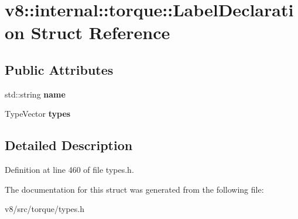 \hypertarget{structv8_1_1internal_1_1torque_1_1LabelDeclaration}{}\section{v8\+:\+:internal\+:\+:torque\+:\+:Label\+Declaration Struct Reference}
\label{structv8_1_1internal_1_1torque_1_1LabelDeclaration}
\subsection*{Public Attributes}
\begin{DoxyCompactItemize}
\item 
\mbox{\label{structv8_1_1internal_1_1torque_1_1LabelDeclaration_a56814c35c6bdcf618b18dcbbd687a411}} 
std\+::string {\bfseries name}
\item 
\mbox{\label{structv8_1_1internal_1_1torque_1_1LabelDeclaration_a82ccafb536f8469d411b058c65793566}} 
Type\+Vector {\bfseries types}
\end{DoxyCompactItemize}


\subsection{Detailed Description}


Definition at line 460 of file types.\+h.



The documentation for this struct was generated from the following file\+:\begin{DoxyCompactItemize}
\item 
v8/src/torque/types.\+h\end{DoxyCompactItemize}
